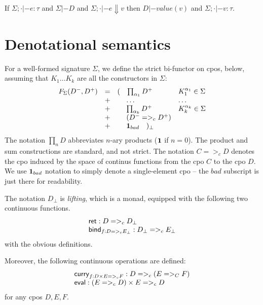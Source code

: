\documentclass[preprint,nocopyrightspace]{sigplanconf}
\begin{document}
\begin{lemma}
If $\Sigma;\cdot |- e : \tau$ and 
$\Sigma |- D$ and $\Sigma;\cdot |- e \Downarrow v$ then $D |- value(v)$ and $\Sigma;\cdot |- v : \tau$.
\end{lemma}


\section{Denotational semantics}
\newcommand{\unitcpo}{{\sf{\bf 1}}}

For a well-formed signature $\Sigma$, we define the strict bi-functor on cpos, below, 
assuming that $K_1\ldots K_k$ are all the constructors in $\Sigma$: 
\[\begin{array}{lclll}
  F_{\Sigma}(D^{-},D^{+}) & = & ( \quad{\prod_{\alpha_1}{D^{+}}} & K_1^{\ar_1} \in \Sigma \\
                      & + & \;\quad\ldots                    & \ldots \\
                      & + & \;\quad{\prod_{\alpha_k}{D^{+}}} & K_k^{\ar_k} \in \Sigma \\ 
                      & + & \;\quad(D^{-} =>_c D^{+}) \\
                      & + & \;\quad\unitcpo_{bad} \quad )_{\bot}
\end{array}\] 
The notation $\prod_{n}{D}$ abbreviates $n$-ary products ($\unitcpo$ if $n = 0$). The product
and sum constructions are standard, and not strict. The notation $C =>_c D$ denotes the cpo 
induced by the space of continus functions from the cpo $C$ to the cpo $D$. We use $\unitcpo_{bad}$ 
notation to simply denote a single-element cpo -- the $bad$ subscript is just there for readability. 

The notation $D_\bot$ is {\em lifting}, which is a monad, equipped with the following two continuous functions.
\[\begin{array}{l}
   \mathsf{ret}   : D =>_c D_\bot \\ 
   \mathsf{bind}_{f : D =>_c E_\bot} : D_\bot =>_c E_\bot
\end{array}\]
with the obvious definitions.

Moreover, the following continuous operations are defined:
\[\begin{array}{l} 
   \mathsf{curry}_{f : D\times E =>_c F} : D =>_c (E =>_C F) \\ 
   \mathsf{eval} : (E =>_c D)\times E =>_c D 
\end{array}\] 
for any cpos $D, E, F$.
\end{document}

